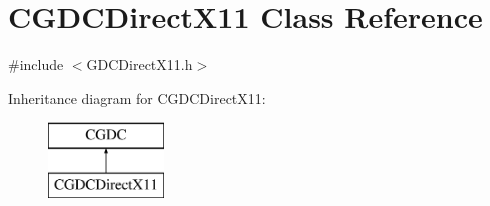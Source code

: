 \hypertarget{class_c_g_d_c_direct_x11}{}\section{C\+G\+D\+C\+Direct\+X11 Class Reference}
\label{class_c_g_d_c_direct_x11}


{\ttfamily \#include $<$G\+D\+C\+Direct\+X11.\+h$>$}

Inheritance diagram for C\+G\+D\+C\+Direct\+X11\+:\begin{figure}[H]
\begin{center}
\leavevmode
\includegraphics[height=2.000000cm]{class_c_g_d_c_direct_x11}
\end{center}
\end{figure}
